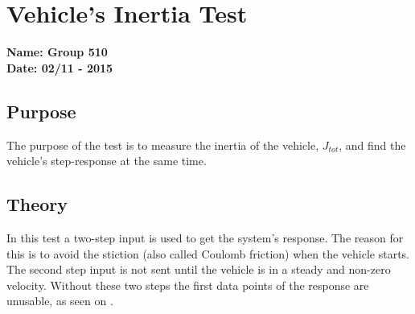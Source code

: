 \pagebreak
\section{Vehicle's Inertia Test} \label{app:inertiaTest}
\textbf{Name: Group 510}\\
\textbf{Date: 02/11 - 2015}

\subsection{Purpose}
The purpose of the test is to measure the inertia of the vehicle, $J_{tot}$, and find the vehicle's step-response at the same time.

\subsection{Theory}



In this test a two-step input is used to get the system's response. The reason for this is to avoid the stiction (also called Coulomb friction) when the vehicle starts. The second step input is not sent until the vehicle is in a steady and non-zero velocity. Without these two steps the first data points of the response are unusable, as seen on .


